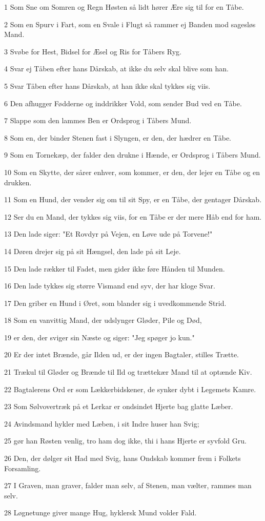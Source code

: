 \par 1 Som Sne om Somren og Regn Høsten så lidt hører Ære sig til for en Tåbe.
\par 2 Som en Spurv i Fart, som en Svale i Flugt så rammer ej Banden mod sagesløs Mand.
\par 3 Svøbe for Hest, Bidsel for Æsel og Ris for Tåbers Ryg.
\par 4 Svar ej Tåben efter hans Dårskab, at ikke du selv skal blive som han.
\par 5 Svar Tåben efter hans Dårskab, at han ikke skal tykkes sig viis.
\par 6 Den afhugger Fødderne og inddrikker Vold, som sender Bud ved en Tåbe.
\par 7 Slappe som den lammes Ben er Ordsprog i Tåbers Mund.
\par 8 Som en, der binder Stenen fast i Slyngen, er den, der hædrer en Tåbe.
\par 9 Som en Tornekæp, der falder den drukne i Hænde, er Ordsprog i Tåbers Mund.
\par 10 Som en Skytte, der sårer enhver, som kommer, er den, der lejer en Tåbe og en drukken.
\par 11 Som en Hund, der vender sig om til sit Spy, er en Tåbe, der gentager Dårskab.
\par 12 Ser du en Mand, der tykkes sig viis, for en Tåbe er der mere Håb end for ham.
\par 13 Den lade siger: "Et Rovdyr på Vejen, en Løve ude på Torvene!"
\par 14 Døren drejer sig på sit Hængsel, den lade på sit Leje.
\par 15 Den lade rækker til Fadet, men gider ikke føre Hånden til Munden.
\par 16 Den lade tykkes sig større Vismand end syv, der har kloge Svar.
\par 17 Den griber en Hund i Øret, som blander sig i uvedkommende Strid.
\par 18 Som en vanvittig Mand, der udslynger Gløder, Pile og Død,
\par 19 er den, der sviger sin Næste og siger: "Jeg spøger jo kun."
\par 20 Er der intet Brænde, går Ilden ud, er der ingen Bagtaler, stilles Trætte.
\par 21 Trækul til Gløder og Brænde til Ild og trættekær Mand til at optænde Kiv.
\par 22 Bagtalerens Ord er som Lækkerbidskener, de synker dybt i Legemets Kamre.
\par 23 Som Sølvovertræk på et Lerkar er ondsindet Hjerte bag glatte Læber.
\par 24 Avindsmand hykler med Læben, i sit Indre huser han Svig;
\par 25 gør han Røsten venlig, tro ham dog ikke, thi i hans Hjerte er syvfold Gru.
\par 26 Den, der dølger sit Had med Svig, hans Ondskab kommer frem i Folkets Forsamling.
\par 27 I Graven, man graver, falder man selv, af Stenen, man vælter, rammes man selv.
\par 28 Løgnetunge giver mange Hug, hyklersk Mund volder Fald.

